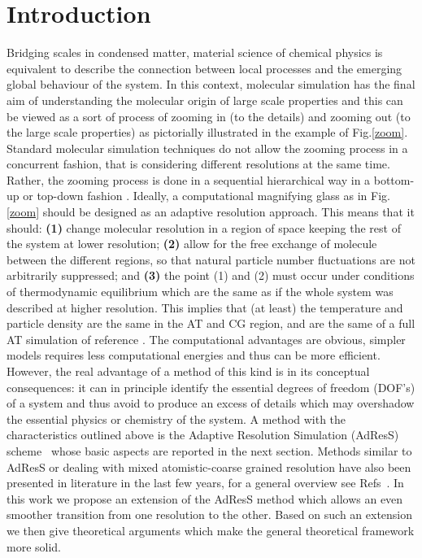 \documentclass[aps,prb,preprint,citeautoscript]{revtex4}
\newcommand{\recheck}[1]{{\color{red} #1}}
\begin{document}
\section{Introduction}
Bridging scales in condensed matter, material science of chemical physics is equivalent to describe the connection between local processes and the emerging global behaviour of the system. In this context, molecular simulation has the final aim of understanding the molecular origin of large scale properties and this can be viewed as a sort of process of zooming in (to the details) and zooming out (to the large scale properties) as pictorially illustrated in the example of Fig.\ref{zoom}. Standard molecular simulation techniques do not allow the zooming process in a concurrent fashion, that is considering different resolutions at the same time. Rather, the zooming process is done in a sequential hierarchical way in a bottom-up or top-down fashion \cite{annurev}. Ideally, a computational magnifying glass as in Fig.\ref{zoom} should be designed as an adaptive resolution approach. This means that it should: {\bf (1)} change molecular resolution in a region of space keeping the rest of the system at lower resolution; {\bf (2)} allow for the free exchange of molecule between the different regions, so that natural particle number fluctuations  are not arbitrarily suppressed; and {\bf (3)} the point (1) and (2) must occur under conditions of thermodynamic equilibrium which are the same as if the whole system was described at higher resolution.
This implies that (at least) the temperature and particle density are the same in the AT and CG region, and are the same of a full AT simulation of reference \cite{annurev}. The computational advantages are obvious, simpler models requires less computational energies and thus can be more efficient. However, the real advantage of a method of this kind is in its conceptual consequences: it can in principle identify the essential degrees of freedom (DOF's) of a system and thus avoid to produce an excess of details which may overshadow the essential physics or chemistry of the system. A method with the characteristics outlined above is the Adaptive Resolution Simulation (AdResS) scheme~\cite{jcp,pre} whose basic aspects are reported in the next section. \recheck{Methods similar to AdResS or dealing with mixed atomistic-coarse grained resolution have also been presented in literature in the last few years, for a general overview see} Refs~\cite{klein,heyden,voth1,voth2,ensingprl,prlcomm}. In this work we propose an extension of the AdResS method which allows an even smoother transition from one resolution to the other. Based on such an extension we then give theoretical arguments which make the general theoretical framework more solid.
\end{document}
